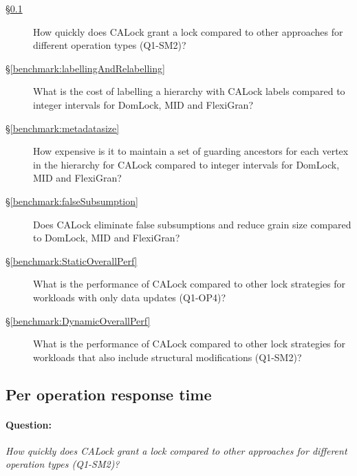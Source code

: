 \begin{description}
		\item[\S \ref{benchmark:PerOpLatency}] How quickly does CALock grant a lock compared to other approaches for different operation types (Q1-SM2)?
		
		\item[\S \ref{benchmark:labellingAndRelabelling}] What is the cost of labelling a hierarchy with CALock labels compared to integer intervals for DomLock, MID and FlexiGran?
		
		\item [\S \ref{benchmark:metadatasize}] How expensive is it to maintain a set of guarding ancestors for each vertex in the hierarchy for CALock compared to integer intervals for DomLock, MID and FlexiGran? 
	
		\item[\S \ref{benchmark:falseSubsumption}] Does CALock eliminate false subsumptions and reduce grain size compared to DomLock, MID and FlexiGran?
		\item[\S \ref{benchmark:StaticOverallPerf}] What is the performance of CALock compared to other lock strategies for workloads with only data updates (Q1-OP4)?
	
		\item[\S \cref{benchmark:DynamicOverallPerf}] What is the performance of CALock compared to other lock strategies for workloads that also include structural modifications (Q1-SM2)?
	\end{description}
	
	
\subsection{Per operation response time} \label{benchmark:PerOpLatency}

\paragraph{Question:} \emph{How quickly does CALock grant a lock compared to other approaches for different operation types (Q1-SM2)?}

